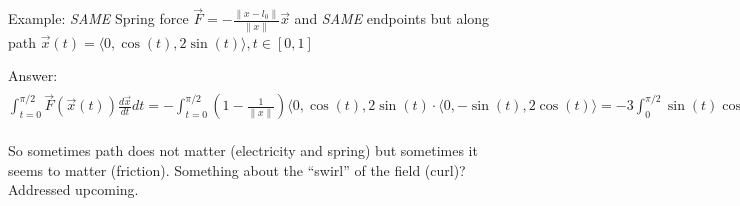 \documentclass[11pt, oneside]{article}   	%
\begin{document}
Example: \emph{SAME} Spring force $\vec{F} = -\frac{\|x - l_0\|}{\|x\|} \vec{x}$ and \emph{SAME} endpoints but along path $\vec{x}(t) = \langle 0, \cos(t), 2\sin(t) \rangle,  t \in [0,1]$

Answer: $\int_{t=0}^{\pi / 2} \vec{F}(\vec{x}(t)) \frac{d \vec{x}}{dt}dt  = - \int_{t=0}^{\pi / 2} (1 - \frac{1}{\|x\|})\langle 0, \cos(t), 2\sin(t) \cdot \langle 0, -\sin(t), 2\cos(t) \rangle= -3  \int_0^{\pi / 2} \sin(t)\cos(t)(1 - \frac{1}{\sqrt{1+3t^2}}dt = 3 \int_{t=0}^{\pi / 2} - \sin(t)\cos(t) + 3 \int_{t=0}^{\pi / 2} \sin(t)\cos(t) \frac{1}{\sqrt{1+3\sin^2(t)}} = 3[\frac{1}{2}\cos^2(t)]_0^{\pi / 2} + 3[\frac{2}{6}(1+3\sin^2(t))^{1/2}]_0^{\pi / 2} = -1/2$

So sometimes path does not matter (electricity and spring) but sometimes it seems to matter (friction). Something about the ``swirl'' of the field (curl)?  Addressed upcoming.
\end{document}
